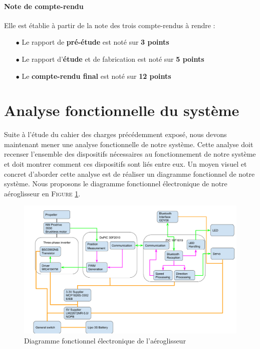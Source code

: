 \documentclass[a4paper,12pt]{report}
\begin{document}
			\vspace{-1.5em}
			
			\paragraph{Note de compte-rendu}
			
			Elle est établie à partir de la note des trois compte-rendus à rendre :
			
			\begin{itemize}
				\item[$\bullet$] Le rapport de \textbf{pré-étude} est noté sur \textbf{3 points}
				\item[$\bullet$] Le rapport d'\textbf{étude} et de fabrication est noté sur \textbf{5 points}
				\item[$\bullet$] Le \textbf{compte-rendu final} est noté sur \textbf{12 points}
			\end{itemize}
			
	\vspace{-1.5em}		
			
	\section{Analyse fonctionnelle du système}
	
	\vspace{-1em}
	
	Suite à l'étude du cahier des charges précédemment exposé, nous devons maintenant mener une analyse fonctionnelle de notre système. Cette analyse doit recenser l'ensemble des dispositifs nécessaires au fonctionnement de notre système et doit montrer comment ces dispositifs sont liés entre eux. Un moyen visuel et concret d'aborder cette analyse est de réaliser un diagramme fonctionnel de notre système. Nous proposons le diagramme fonctionnel électronique de notre aéroglisseur en \textsc{Figure \ref{full_functional}}.
	
	\begin{figure}[h]
		\begin{center}
			\includegraphics[scale=0.33]{../Illus/full_functional.png}
		\end{center}
		\caption{Diagramme fonctionnel électronique de l'aéroglisseur}
		\label{full_functional}
	\end{figure}
	
\end{document}
